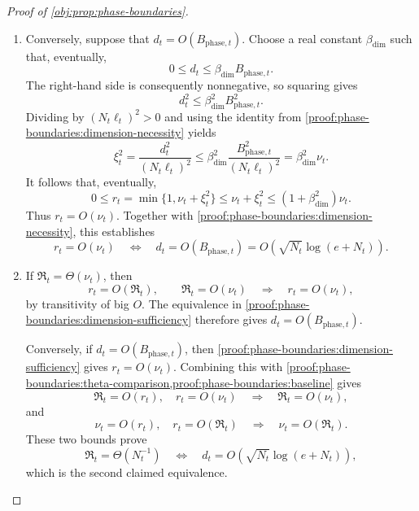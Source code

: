 \begin{proof}[Proof of \cref{obj:prop:phase-boundaries}]
\begin{enumerate}
\item\label{proof:phase-boundaries:dimension-sufficiency} Conversely, suppose that \(d_t=O(B_{\mathrm{phase},t})\). Choose a real constant
\(\beta_{\mathrm{dim}}\) such that, eventually,
\[
0\le d_t\le\beta_{\mathrm{dim}}B_{\mathrm{phase},t}.
\]
The right-hand side is consequently nonnegative, so squaring gives
\[
d_t^2\le\beta_{\mathrm{dim}}^2B_{\mathrm{phase},t}^2.
\]
Dividing by \((N_t\ell_t)^2>0\) and using the identity from \cref{proof:phase-boundaries:dimension-necessity} yields
\[
\xi_t^2
=\frac{d_t^2}{(N_t\ell_t)^2}
\le
\beta_{\mathrm{dim}}^2
\frac{B_{\mathrm{phase},t}^2}{(N_t\ell_t)^2}
=\beta_{\mathrm{dim}}^2\nu_t.
\]
It follows that, eventually,
\[
0\le r_t
=\min\{1,\nu_t+\xi_t^2\}
\le\nu_t+\xi_t^2
\le(1+\beta_{\mathrm{dim}}^2)\nu_t.
\]
Thus \(r_t=O(\nu_t)\). Together with \cref{proof:phase-boundaries:dimension-necessity}, this establishes
\[
r_t=O(\nu_t)
\quad\Longleftrightarrow\quad
d_t=O(B_{\mathrm{phase},t})
=O\!\left(\sqrt{N_t}\log(e+N_t)\right).
\]

\item If \(\mathfrak R_t=\Theta(\nu_t)\), then
\[
r_t=O(\mathfrak R_t),
\qquad
\mathfrak R_t=O(\nu_t)
\quad\Longrightarrow\quad
r_t=O(\nu_t),
\]
by transitivity of big \(O\). The equivalence in \cref{proof:phase-boundaries:dimension-sufficiency} therefore gives
\(d_t=O(B_{\mathrm{phase},t})\).

Conversely, if \(d_t=O(B_{\mathrm{phase},t})\), then \cref{proof:phase-boundaries:dimension-sufficiency} gives \(r_t=O(\nu_t)\). Combining this with \cref{proof:phase-boundaries:theta-comparison,proof:phase-boundaries:baseline} gives
\[
\mathfrak R_t=O(r_t),\quad r_t=O(\nu_t)
\quad\Longrightarrow\quad
\mathfrak R_t=O(\nu_t),
\]
and
\[
\nu_t=O(r_t),\quad r_t=O(\mathfrak R_t)
\quad\Longrightarrow\quad
\nu_t=O(\mathfrak R_t).
\]
These two bounds prove
\[
\mathfrak R_t=\Theta(N_t^{-1})
\quad\Longleftrightarrow\quad
d_t=O\!\left(\sqrt{N_t}\log(e+N_t)\right),
\]
which is the second claimed equivalence.
\end{enumerate}
\end{proof}


